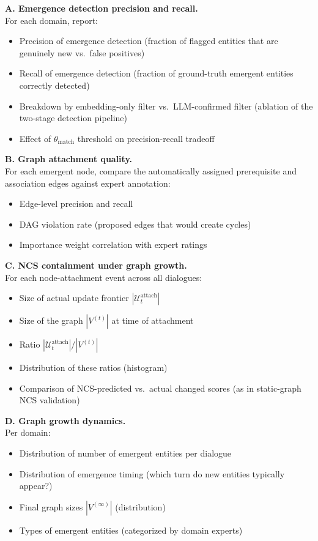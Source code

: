 \documentclass[11pt,a4paper]{article}
\newcommand{\placeholder}[1]{%
  \begin{tcolorbox}[colback=yellow!10,colframe=orange!60!black,
    fonttitle=\bfseries,title=Placeholder]
    #1
  \end{tcolorbox}%
}
\begin{document}
\placeholder{%
  \textbf{A. Emergence detection precision and recall.}\\
  For each domain, report:
  \begin{itemize}[noitemsep]
    \item Precision of emergence detection (fraction of flagged entities
          that are genuinely new vs.\ false positives)
    \item Recall of emergence detection (fraction of ground-truth emergent
          entities correctly detected)
    \item Breakdown by embedding-only filter vs.\ LLM-confirmed filter
          (ablation of the two-stage detection pipeline)
    \item Effect of $\theta_{\mathrm{match}}$ threshold on
          precision-recall tradeoff
  \end{itemize}

  \textbf{B. Graph attachment quality.}\\
  For each emergent node, compare the automatically assigned prerequisite
  and association edges against expert annotation:
  \begin{itemize}[noitemsep]
    \item Edge-level precision and recall
    \item DAG violation rate (proposed edges that would create cycles)
    \item Importance weight correlation with expert ratings
  \end{itemize}

  \textbf{C. NCS containment under graph growth.}\\
  For each node-attachment event across all dialogues:
  \begin{itemize}[noitemsep]
    \item Size of actual update frontier $|\mathcal{U}_t^{\mathrm{attach}}|$
    \item Size of the graph $|V^{(t)}|$ at time of attachment
    \item Ratio $|\mathcal{U}_t^{\mathrm{attach}}| / |V^{(t)}|$
    \item Distribution of these ratios (histogram)
    \item Comparison of NCS-predicted vs.\ actual changed scores (as in
          static-graph NCS validation)
  \end{itemize}

  \textbf{D. Graph growth dynamics.}\\
  Per domain:
  \begin{itemize}[noitemsep]
    \item Distribution of number of emergent entities per dialogue
    \item Distribution of emergence timing (which turn do new entities
          typically appear?)
    \item Final graph sizes $|V^{(\infty)}|$ (distribution)
    \item Types of emergent entities (categorized by domain experts)
  \end{itemize}

}
\end{document}
